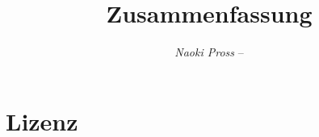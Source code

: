 \documentclass[]{tex/hsrzf}
\author{\textsl{Naoki Pross} -- \texttt{\theauthoremail}}
\title{\texttt{\themodule} Zusammenfassung}
\date{\thesemester}
\begin{document}
\maketitle
\tableofcontents
\section{Lizenz}
\doclicenseThis

\newpage





\end{document}
